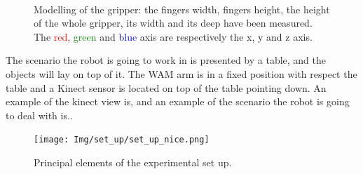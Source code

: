 \begin{figure}[htp]
\centering
\begin{subfigure}[t]{0.5\textwidth}
\centering
{}
\end{subfigure} \\
\begin{subfigure}[t]{0.3\textwidth}
\centering
{}
\end{subfigure}
\hspace{3cm}
\begin{subfigure}[t]{0.3\textwidth}
\centering
{}
\end{subfigure}
\caption{Modelling of the gripper: the fingers width, fingers height, the height of the whole gripper, its width and its deep have been measured. The \textcolor{red}{red}, \textcolor{green}{green} and \textcolor{blue}{blue} axis are respectively the x, y and z axis.}\label{fig:gripper_modelling}
\end{figure}

The scenario the robot is going to work in is presented by a table, and the objects will lay on top of it. The WAM arm is in a fixed position with respect the table and a Kinect sensor is located on top of the table pointing down. An example of the kinect view is, and an example of the scenario the robot is going to deal with is.. 

\begin{figure}[htp]
\centering
\texttt{[image: Img/set\_up/set\_up\_nice.png]}
\caption{Principal elements of the experimental set up.}\label{fig:setup}
\end{figure}